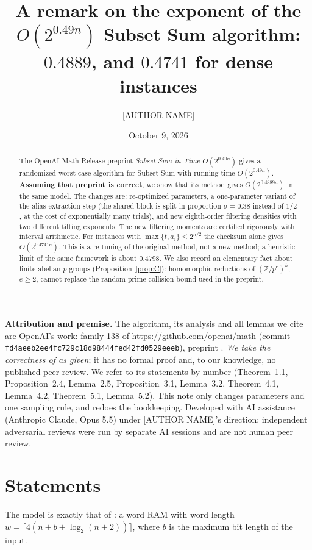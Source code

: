 \documentclass[11pt]{amsart}
\title[Subset Sum: the exponent $0.49$ re-tuned to $0.4889$]{A remark on the exponent of the $O(2^{0.49n})$ Subset Sum algorithm: $0.4889$, and $0.4741$ for dense instances}
\author{[AUTHOR NAME]}
\date{October 9, 2026}
\theoremstyle{remark}
\newcommand{\Z}{\mathbb Z}
\begin{document}
\begin{abstract}
The OpenAI Math Release preprint \emph{Subset Sum in Time $O(2^{0.49n})$} gives a randomized worst-case
algorithm for Subset Sum with running time $O(2^{0.49n})$. \textbf{Assuming that preprint is correct},
we show that its method gives $O(2^{0.4889n})$ in the same model. The changes are: re-optimized
parameters, a one-parameter variant of the alias-extraction step (the shared block is split in
proportion $\sigma=0.38$ instead of $1/2$, at the cost of exponentially many trials), and new
eighth-order filtering densities with two different tilting exponents. The new filtering moments are
certified rigorously with interval arithmetic. For instances with $\max\{t,a_i\}\le2^{n/2}$ the
checksum alone gives $O(2^{0.4741n})$. This is a re-tuning of the original method, not a new
method; a heuristic limit of the same framework is about $0.4798$. We also record an elementary fact
about finite abelian $p$-groups (Proposition~\ref{prop:C}): homomorphic reductions of
$(\Z/p^e)^k$, $e\ge2$, cannot replace the random-prime collision bound used in the preprint.
\end{abstract}
\maketitle

\noindent\textbf{Attribution and premise.} The algorithm, its analysis and all lemmas we cite are
OpenAI's work: family 138 of \url{https://github.com/openai/math} (commit
\nolinkurl{fd4aeeb2ee4fc729c18d98444fed42fd0529eeeb}), preprint \cite{oai}. \emph{We take the
correctness of \cite{oai} as given}; it has no formal proof and, to our knowledge, no published
peer review. We refer to its statements by number (Theorem~1.1, Proposition~2.4, Lemma~2.5,
Proposition~3.1, Lemma~3.2, Theorem~4.1, Lemma~4.2, Theorem~5.1, Lemma~5.2). This note only changes
parameters and one sampling rule, and redoes the bookkeeping. Developed with AI assistance (Anthropic
Claude, Opus 5.5) under [AUTHOR NAME]'s direction; independent adversarial reviews were run by
separate AI sessions and are not human peer review.

\section{Statements}
The model is exactly that of \cite[Section~1.1]{oai}: a word RAM with word length
$w=\lceil4(n+b+\log_2(n+2))\rceil$, where $b$ is the maximum bit length of the input.
\end{document}
